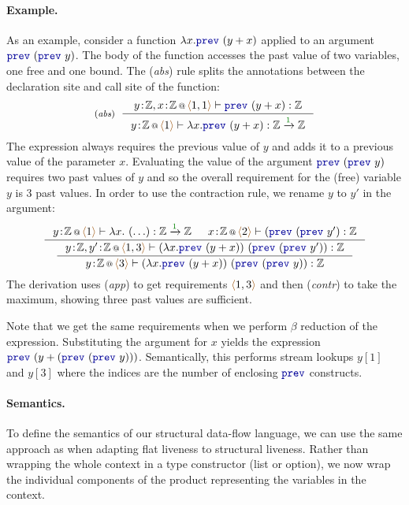 \paragraph{Example.} As an example, consider a function $\lambda x.\kvd{prev}~(y+x)$ applied to an argument
$\kvd{prev}~(\kvd{prev}~y)$. The body of the function accesses the past value of two variables, one free
and one bound. The (\emph{abs}) rule splits the annotations between the declaration site and call site
of the function:
%
\begin{equation*}
\tyrule{abs}
  {\coctx{y\!:\!\mathbb{Z}, x\!:\!\mathbb{Z}}{\alift{1, 1}} \vdash \kvd{prev}~(y+x) : \mathbb{Z} }
  {\coctx{y\!:\!\mathbb{Z}}{\alift{1}} \vdash \lambda x . \kvd{prev}~(y+x) : \mathbb{Z} \xrightarrow{\cclrd{1}} \mathbb{Z} }
\end{equation*}
%
The expression always requires the previous value of $y$ and adds it to a previous value of the 
parameter $x$. Evaluating the value of the argument $\kvd{prev}~(\kvd{prev}~y)$ requires two past 
values of $y$ and so the overall requirement for the (free) variable $y$ is $3$ past values. In 
order to use the contraction rule, we rename $y$ to $y'$ in the argument:
%
\begin{equation*}
\inference
  { \coctx{y\!:\!\mathbb{Z}}{\alift{1} } \vdash \lambda x.~(\ldots) : \mathbb{Z} \xrightarrow{\cclrd{1}} \mathbb{Z} &
    \coctx{x\!:\!\mathbb{Z}}{\alift{2}} \vdash (\kvd{prev}~(\kvd{prev}~y') : \mathbb{Z} }
{\inference
  { \coctx{y\!:\!\mathbb{Z}, y'\!:\!\mathbb{Z}}{\alift{1,3}} \vdash (\lambda x.\kvd{prev}~(y+x))~(\kvd{prev}~(\kvd{prev}~y')) : \mathbb{Z} }
  { \coctx{y\!:\!\mathbb{Z}}{\alift{3}} \vdash (\lambda x.\kvd{prev}~(y+x))~(\kvd{prev}~(\kvd{prev}~y)) : \mathbb{Z} } }
\end{equation*}
%
The derivation uses (\emph{app}) to get requirements $\alift{1,3}$ and then (\emph{contr}) to take 
the maximum, showing three past values are sufficient. 

Note that we get the same requirements when we perform $\beta$ reduction of the expression. 
Substituting the argument for $x$ yields the expression $\kvd{prev}~(y+(\kvd{prev}~(\kvd{prev}~y)))$. 
Semantically, this performs stream lookups $y[1]$ and $y[3]$ where the indices are the 
number of enclosing $\kvd{prev}$ constructs.

\paragraph{Semantics.}
To define the semantics of our structural data-flow language, we can use the same approach as when
adapting flat liveness to structural liveness. Rather than wrapping the whole context in a type 
constructor (list or option), we now wrap the individual components of the product representing 
the variables in the context. 

